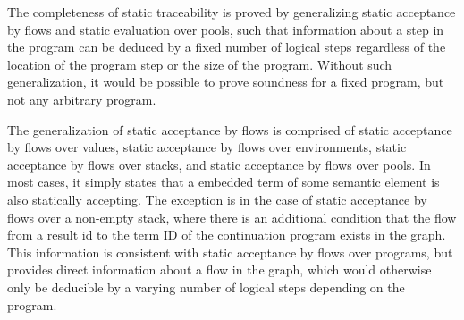 \documentclass[10pt]{article}
\begin{document}
The completeness of static traceability is proved by generalizing
static acceptance by flows and static evaluation over pools, such that information about a step in
the program can be deduced by a fixed number of logical steps regardless of the location of the
program step or the size of the program. Without such generalization, it would be possible to
prove soundness for a fixed program, but not any arbitrary program.

The generalization of static acceptance by flows is comprised of static acceptance by flows over values,
static acceptance by flows over environments, static acceptance by flows over stacks, and static
acceptance by flows over pools.
In most cases, it simply states that a embedded term of some semantic element is also statically
accepting. The exception is in the case of
static acceptance by flows over a non-empty stack, where
there is an additional condition that the flow
from a result id to the term ID
of the continuation program exists in the graph.
This information is consistent with static
acceptance by flows over programs, but provides direct information about a flow in the
graph, which would otherwise only be deducible by a varying number of logical steps
depending on the program.
\end{document}
